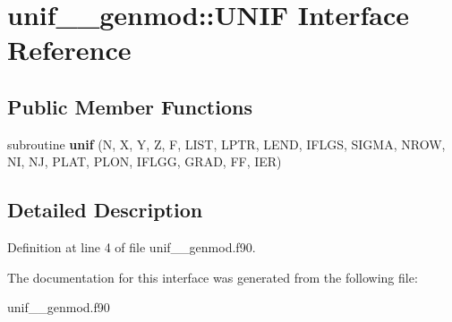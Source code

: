 \hypertarget{interfaceunif____genmod_1_1_u_n_i_f}{\section{unif\+\_\+\+\_\+genmod\+:\+:U\+N\+I\+F Interface Reference}
\label{interfaceunif____genmod_1_1_u_n_i_f}
}
\subsection*{Public Member Functions}
\begin{DoxyCompactItemize}
\item 
\hypertarget{interfaceunif____genmod_1_1_u_n_i_f_a921819038977590e467cc07c5ce5513b}{subroutine {\bfseries unif} (N, X, Y, Z, F, L\+I\+S\+T, L\+P\+T\+R, L\+E\+N\+D, I\+F\+L\+G\+S, S\+I\+G\+M\+A, N\+R\+O\+W, N\+I, N\+J, P\+L\+A\+T, P\+L\+O\+N, I\+F\+L\+G\+G, G\+R\+A\+D, F\+F, I\+E\+R)}\label{interfaceunif____genmod_1_1_u_n_i_f_a921819038977590e467cc07c5ce5513b}

\end{DoxyCompactItemize}


\subsection{Detailed Description}


Definition at line 4 of file unif\+\_\+\+\_\+genmod.\+f90.



The documentation for this interface was generated from the following file\+:\begin{DoxyCompactItemize}
\item 
unif\+\_\+\+\_\+genmod.\+f90\end{DoxyCompactItemize}
